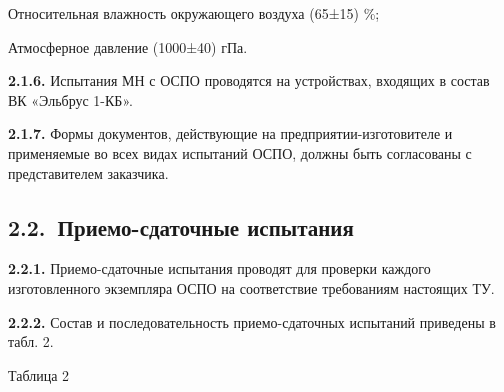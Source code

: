 \documentclass[11pt,a4paper]{article}
\begin{document}
Относительная влажность окружающего воздуха (65±15) \%;

Атмосферное давление (1000±40) гПа.

\par\textbf{2.1.6.} Испытания МН с ОСПО проводятся на устройствах, входящих в состав ВК «Эльбрус 1-КБ».\par
\par\textbf{2.1.7.} Формы документов, действующие на предприятии-изготовителе и применяемые во всех видах испытаний ОСПО, должны быть согласованы с представителем заказчика.\par
\subsection*{2.2.~Приемо-сдаточные испытания}
\par\textbf{2.2.1.} Приемо-сдаточные испытания проводят для проверки каждого изготовленного экземпляра ОСПО на соответствие требованиям настоящих ТУ.\par
\par\textbf{2.2.2.} Состав и последовательность приемо-сдаточных испытаний приведены в табл. 2.\par
Таблица 2
\end{document}
